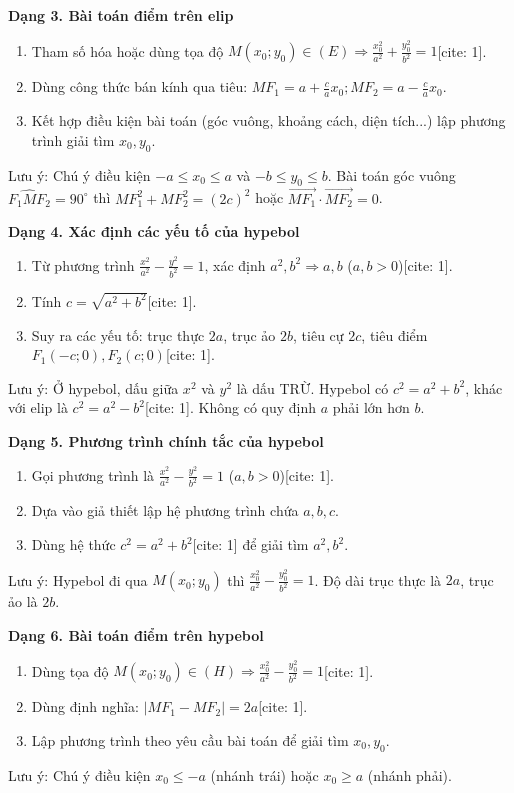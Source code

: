 \textbf{Dạng 3. Bài toán điểm trên elip}
\begin{enumerate}
\item Tham số hóa hoặc dùng tọa độ $M(x_0; y_0) \in (E) \Rightarrow \frac{x_0^2}{a^2} + \frac{y_0^2}{b^2} = 1$[cite: 1].
\item Dùng công thức bán kính qua tiêu: $MF_1 = a + \frac{c}{a}x_0; MF_2 = a - \frac{c}{a}x_0$.
\item Kết hợp điều kiện bài toán (góc vuông, khoảng cách, diện tích...) lập phương trình giải tìm $x_0, y_0$.
\end{enumerate}
Lưu ý: Chú ý điều kiện $-a \le x_0 \le a$ và $-b \le y_0 \le b$. Bài toán góc vuông $\widehat{F_1MF_2} = 90^\circ$ thì $MF_1^2 + MF_2^2 = (2c)^2$ hoặc $\overrightarrow{MF_1} \cdot \overrightarrow{MF_2} = 0$.

\textbf{Dạng 4. Xác định các yếu tố của hypebol}
\begin{enumerate}
\item Từ phương trình $\frac{x^2}{a^2} - \frac{y^2}{b^2} = 1$, xác định $a^2, b^2 \Rightarrow a, b$ ($a, b > 0$)[cite: 1].
\item Tính $c = \sqrt{a^2 + b^2}$[cite: 1].
\item Suy ra các yếu tố: trục thực $2a$, trục ảo $2b$, tiêu cự $2c$, tiêu điểm $F_1(-c; 0), F_2(c; 0)$[cite: 1].
\end{enumerate}
Lưu ý: Ở hypebol, dấu giữa $x^2$ và $y^2$ là dấu TRỪ. Hypebol có $c^2 = a^2 + b^2$, khác với elip là $c^2 = a^2 - b^2$[cite: 1]. Không có quy định $a$ phải lớn hơn $b$.

\textbf{Dạng 5. Phương trình chính tắc của hypebol}
\begin{enumerate}
\item Gọi phương trình là $\frac{x^2}{a^2} - \frac{y^2}{b^2} = 1$ ($a, b > 0$)[cite: 1].
\item Dựa vào giả thiết lập hệ phương trình chứa $a, b, c$.
\item Dùng hệ thức $c^2 = a^2 + b^2$[cite: 1] để giải tìm $a^2, b^2$.
\end{enumerate}
Lưu ý: Hypebol đi qua $M(x_0; y_0)$ thì $\frac{x_0^2}{a^2} - \frac{y_0^2}{b^2} = 1$. Độ dài trục thực là $2a$, trục ảo là $2b$.

\textbf{Dạng 6. Bài toán điểm trên hypebol}
\begin{enumerate}
\item Dùng tọa độ $M(x_0; y_0) \in (H) \Rightarrow \frac{x_0^2}{a^2} - \frac{y_0^2}{b^2} = 1$[cite: 1].
\item Dùng định nghĩa: $|MF_1 - MF_2| = 2a$[cite: 1].
\item Lập phương trình theo yêu cầu bài toán để giải tìm $x_0, y_0$.
\end{enumerate}
Lưu ý: Chú ý điều kiện $x_0 \le -a$ (nhánh trái) hoặc $x_0 \ge a$ (nhánh phải).


